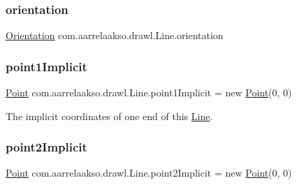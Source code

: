 \subsubsection{\texorpdfstring{orientation}{orientation}}
{\footnotesize\ttfamily \hyperlink{enumcom_1_1aarrelaakso_1_1drawl_1_1_line_1_1_orientation}{Orientation} com.\+aarrelaakso.\+drawl.\+Line.\+orientation\hspace{0.3cm}{\ttfamily [private]}}

\mbox{\label{classcom_1_1aarrelaakso_1_1drawl_1_1_line_a48220286707ae05387f9c99d9e08784c}} 
\subsubsection{\texorpdfstring{point1\+Implicit}{point1Implicit}}
{\footnotesize\ttfamily \hyperlink{classcom_1_1aarrelaakso_1_1drawl_1_1_point}{Point} com.\+aarrelaakso.\+drawl.\+Line.\+point1\+Implicit = new \hyperlink{classcom_1_1aarrelaakso_1_1drawl_1_1_point}{Point}(0, 0)\hspace{0.3cm}{\ttfamily [private]}}



The implicit coordinates of one end of this \hyperlink{classcom_1_1aarrelaakso_1_1drawl_1_1_line}{Line}. 

\mbox{\label{classcom_1_1aarrelaakso_1_1drawl_1_1_line_a055d1e743c66cc808f108664b38d7de2}} 
\subsubsection{\texorpdfstring{point2\+Implicit}{point2Implicit}}
{\footnotesize\ttfamily \hyperlink{classcom_1_1aarrelaakso_1_1drawl_1_1_point}{Point} com.\+aarrelaakso.\+drawl.\+Line.\+point2\+Implicit = new \hyperlink{classcom_1_1aarrelaakso_1_1drawl_1_1_point}{Point}(0, 0)\hspace{0.3cm}{\ttfamily [private]}}



